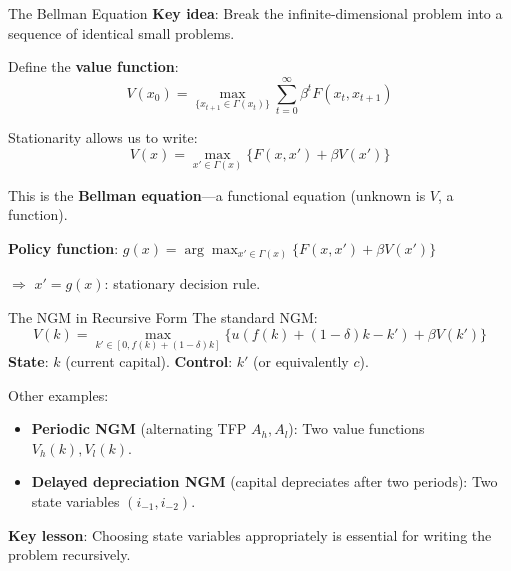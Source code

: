 \documentclass[blue]{beamer}
\begin{document}
\begin{frame}{The Bellman Equation}
	\textbf{Key idea}: Break the infinite-dimensional problem into a sequence of identical small problems.
	

	Define the \textbf{value function}:
	\[
	V(x_0) = \max_{\{x_{t+1} \in \Gamma(x_t)\}} \sum_{t=0}^\infty \beta^t F(x_t, x_{t+1})
	\]
	
	Stationarity allows us to write:
	\[
	V(x) = \max_{x' \in \Gamma(x)} \{F(x, x') + \beta V(x')\}
	\]
	
	This is the \textbf{Bellman equation}---a functional equation (unknown is $V$, a function).
	

	\textbf{Policy function}: $g(x) = \arg\max_{x' \in \Gamma(x)} \{F(x, x') + \beta V(x')\}$
	
	$\Rightarrow$ $x' = g(x)$: stationary decision rule.
\end{frame}

\begin{frame}{The NGM in Recursive Form}
	The standard NGM:
	\[
	V(k) = \max_{k' \in [0, f(k)+(1-\delta)k]} \{u(f(k) + (1-\delta)k - k') + \beta V(k')\}
	\]
	\textbf{State}: $k$ (current capital). \textbf{Control}: $k'$ (or equivalently $c$).
	
	\bigskip
	Other examples:
	\vspace{-6pt}
	\begin{itemize}
	\item \textbf{Periodic NGM} (alternating TFP $A_h, A_l$): Two value functions $V_h(k), V_l(k)$.
	\item \textbf{Delayed depreciation NGM} (capital depreciates after two periods): Two state variables $(i_{-1}, i_{-2})$.
	\end{itemize}
	
	\textbf{Key lesson}: Choosing state variables appropriately is essential for writing the problem recursively.
\end{frame}
\end{document}
